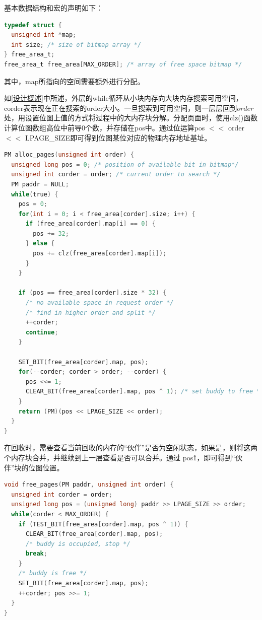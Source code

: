 \documentclass[UTF8,12pt]{ctexart}
\begin{document}
    基本数据结构和宏的声明如下：
    
    \begin{lstlisting}[language=C]
typedef struct {
  unsigned int *map;
  int size; /* size of bitmap array */
} free_area_t;
free_area_t free_area[MAX_ORDER]; /* array of free space bitmap */
    \end{lstlisting}
其中，map所指向的空间需要额外进行分配。

    如\ref{设计概述}中所述，外层的while循环从小块内存向大块内存搜索可用空间，corder表示现在正在搜索的order大小。一旦搜索到可用空间，则一层层回到$order$处，用设置位图上值的方式将过程中的大内存块分解。分配页面时，使用clz()函数计算位图数组高位中前导0个数，并存储在pos中。通过位运算pos $<<$ order $<<$ LPAGE\_SIZE即可得到位图某位对应的物理内存地址基址。
    
    \begin{lstlisting}[language=C]
PM alloc_pages(unsigned int order) {
  unsigned long pos = 0; /* position of available bit in bitmap*/
  unsigned int corder = order; /* current order to search */
  PM paddr = NULL;
  while(true) {
    pos = 0;
    for(int i = 0; i < free_area[corder].size; i++) {
      if (free_area[corder].map[i] == 0) {
        pos += 32;
      } else {
        pos += clz(free_area[corder].map[i]);
      }
    }

    if (pos == free_area[corder].size * 32) {
      /* no available space in request order */
      /* find in higher order and split */
      ++corder;
      continue;
    }

    SET_BIT(free_area[corder].map, pos);
    for(--corder; corder > order; --corder) {
      pos <<= 1;
      CLEAR_BIT(free_area[corder].map, pos ^ 1); /* set buddy to free */
    }
    return (PM)(pos << LPAGE_SIZE << order);
  }
}
    \end{lstlisting}

    在回收时，需要查看当前回收的内存的“伙伴”是否为空闲状态，如果是，则将这两个内存块合并，并继续到上一层查看是否可以合并。通过 pos\^1，即可得到“伙伴”块的位图位置。

    \begin{lstlisting}[language=C]
void free_pages(PM paddr, unsigned int order) {
  unsigned int corder = order;
  unsigned long pos = (unsigned long) paddr >> LPAGE_SIZE >> order;
  while(corder < MAX_ORDER) {
    if (TEST_BIT(free_area[corder].map, pos ^ 1)) {
      CLEAR_BIT(free_area[corder].map, pos);
      /* buddy is occupied, stop */
      break;
    }
    /* buddy is free */
    SET_BIT(free_area[corder].map, pos);
    ++corder; pos >>= 1;
  }
}
    \end{lstlisting}
    
\end{document}
